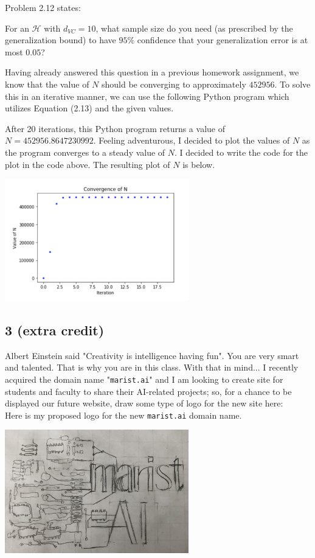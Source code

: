 \documentclass[a4paper]{article}
\begin{document}
Problem 2.12 states:
\begin{displayquote}
For an $\mathcal{H}$ with $d_{VC} = 10$, what sample size do you 
need (as prescribed by the generalization bound) to have $95\%$ confidence that your 
generalization error is at most $0.05$?
\end{displayquote}
Having already answered this question in a previous homework assignment, we know that the value 
of $N$ should be converging to approximately $452956$.  To solve this in an iterative manner, 
we can use the following Python program which utilizes Equation (2.13) and the given values.

After 20 iterations, this Python program returns a value of $N = 452956.8647230992$.  Feeling 
adventurous, I decided to plot the values of $N$ as the program converges to a steady value of 
$N$.  I decided to write the code for the plot in the code above.  The resulting plot of $N$ 
is below.
\begin{center}
    \includegraphics[width=0.6\textwidth]{NConvergence.jpg}
\end{center}


\subsection{3 (extra credit)} Albert Einstein said "Creativity is intelligence having fun".  You 
are very smart and talented.  That is why you are in this class.  With that in mind... I recently 
acquired the domain name  "\verb|marist.ai|" and I am looking to create site for students and 
faculty to share their AI-related projects; so, for a chance to be displayed our future website, 
draw some type of logo for the new site here:\\

Here is my proposed logo for the new \verb|marist.ai| domain name.
\begin{center}
    \includegraphics[width=0.6\textwidth]{logo.jpg}
\end{center}
\end{document}
